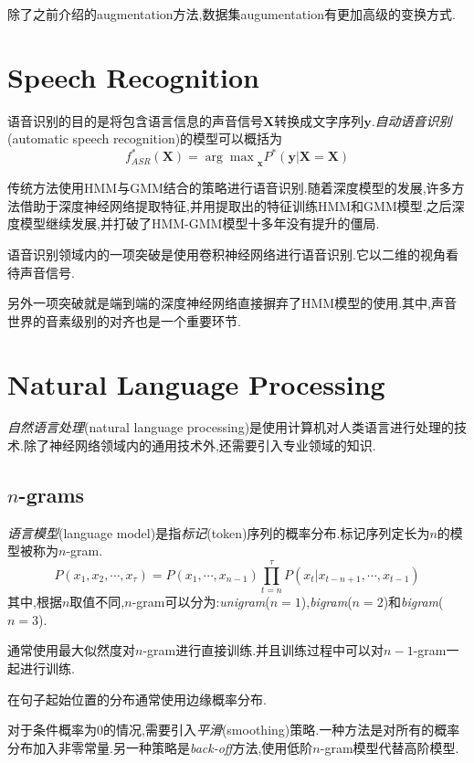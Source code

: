除了之前介绍的augmentation方法,数据集augumentation有更加高级的变换方式.

\section{Speech Recognition}

语音识别的目的是将包含语言信息的声音信号$\bm X$转换成文字序列$\bm y$.\textit{自动语音识别}(automatic speech recognition)的模型可以概括为
\begin{equation}
f^\ast_{ASR}(\bm X)={\arg\max}_{\bm x}P^\ast(\bm y|\mathbf X=\bm X)
\end{equation}

传统方法使用HMM与GMM结合的策略进行语音识别.随着深度模型的发展,许多方法借助于深度神经网络提取特征,并用提取出的特征训练HMM和GMM模型.之后深度模型继续发展,并打破了HMM-GMM模型十多年没有提升的僵局.

语音识别领域内的一项突破是使用卷积神经网络进行语音识别.它以二维的视角看待声音信号.

另外一项突破就是端到端的深度神经网络直接摒弃了HMM模型的使用.其中,声音世界的音素级别的对齐也是一个重要环节.

\section{Natural Language Processing}

\textit{自然语言处理}(natural language processing)是使用计算机对人类语言进行处理的技术.除了神经网络领域内的通用技术外,还需要引入专业领域的知识.

\subsection{$n$-grams}

\textit{语言模型}(language model)是指\textit{标记}(token)序列的概率分布.标记序列定长为$n$的模型被称为$n$-gram.
\begin{equation}
P(x_1,x_2,\cdots,x_\tau)=P(x_1,\cdots,x_{n-1})\prod_{t=n}^\tau P(x_t|x_{t-n+1},\cdots,x_{t-1})
\end{equation}
其中,根据$n$取值不同,$n$-gram可以分为:\textit{unigram}($n=1$),\textit{bigram}($n=2$)和\textit{bigram}($n=3$).

通常使用最大似然度对$n$-gram进行直接训练.并且训练过程中可以对$n-1$-gram一起进行训练.

在句子起始位置的分布通常使用边缘概率分布.

对于条件概率为$0$的情况,需要引入\textit{平滑}(smoothing)策略.一种方法是对所有的概率分布加入非零常量.另一种策略是\textit{back-off}方法,使用低阶$n$-gram模型代替高阶模型.

